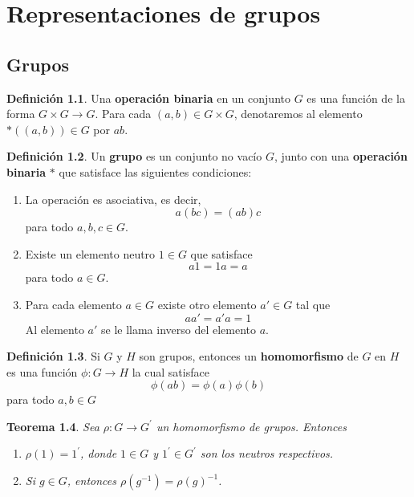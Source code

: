 \documentclass[12pt]{book}
\newtheorem{theorem}{Teorema}[section]
\theoremstyle{definition}
\newtheorem{definition}[theorem]{Definición}
\newcounter{in}
\newcounter{ini}
\begin{document}
\chapter{Representaciones de grupos}
\label{Representaciones de grupos}

\section{Grupos}

\begin{definition}
  Una \textbf{operación binaria} en un conjunto $G$ es una función
  de la forma $G  \times G \rightarrow G$. Para cada $(a,b)\in G
  \times G$, denotaremos al elemento $*((a,b))\in G$ por $ab$. 
\end{definition} 

\begin{definition} 
  Un \textbf{grupo} es un conjunto no vacío $G$, junto con una
  \textbf{operación binaria} $*$ que satisface las siguientes condiciones:
    \begin{enumerate}
    \item La operación es asociativa, es decir, $$a(bc)=(ab)c$$ para todo $a,b,c \in G$.
    \item Existe un elemento neutro $1 \in G$ que
      satisface $$a1=1a=a$$ para todo $a \in G$.
    \item Para cada elemento $a \in G$ existe otro elemento $a' \in G$
      tal que $$aa'=a'a=1$$ Al elemento $a'$ se le llama inverso del elemento $a$.
    \end{enumerate}
\end{definition}

\begin{definition}
  Si $G$ y $H$ son grupos, entonces un \textbf{homomorfismo} de $G$
  en $H$ es una función $\phi:G\rightarrow H$ la cual
  satisface $$\phi(ab)=\phi(a)\phi(b)$$ para todo $a,b \in G$
\end{definition}

\begin{theorem}
  Sea $\rho:G\rightarrow G^{'}$ un homomorfismo de grupos. Entonces
  \begin{enumerate}
    \item $\rho(1)=1^{'}$, donde $1\in G$ y  $1^{'}\in G^{'}$ son los
    neutros respectivos. 
    \item Si $g\in G$, entonces $\rho(g^{-1})=\rho (g)^{-1}$.
  \end{enumerate}
\end{theorem}
\end{document}
